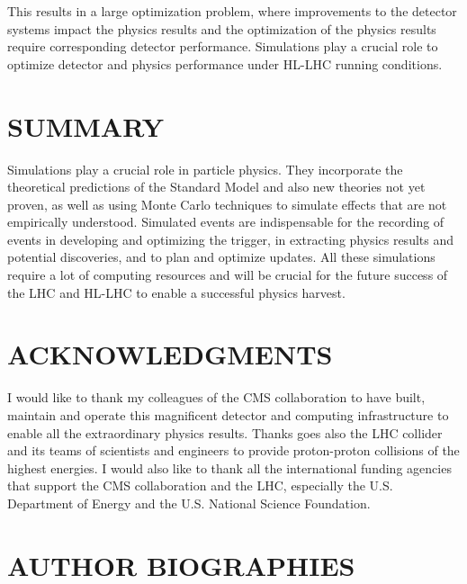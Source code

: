 \documentclass{wscpaperproc}
\theoremstyle{wsc}
\begin{document}
This results in a large optimization problem, where improvements to the detector systems impact the physics results and the optimization of the physics results require corresponding detector performance. Simulations play a crucial role to optimize detector and physics performance under HL-LHC running conditions. 

\section{SUMMARY}
\label{sec:summary}

Simulations play a crucial role in particle physics. They incorporate the theoretical predictions of the Standard Model and also new theories not yet proven, as well as using Monte Carlo techniques to simulate effects that are not empirically understood. Simulated events are indispensable for the recording of events in developing and optimizing the trigger, in extracting physics results and potential discoveries, and to plan and optimize updates. All these simulations require a lot of computing resources and will be crucial for the future success of the LHC and HL-LHC to enable a successful physics harvest.

\section*{ACKNOWLEDGMENTS}
I would like to thank my colleagues of the CMS collaboration to have built, maintain and operate this magnificent detector and computing infrastructure to enable all the extraordinary physics results. Thanks goes also the LHC collider and its teams of scientists and engineers to provide proton-proton collisions of the highest energies. I would also like to thank all the international funding agencies that support the CMS collaboration and the LHC, especially the U.S. Department of Energy and the U.S. National Science Foundation.

\appendix





\section*{AUTHOR BIOGRAPHIES}
\end{document}
